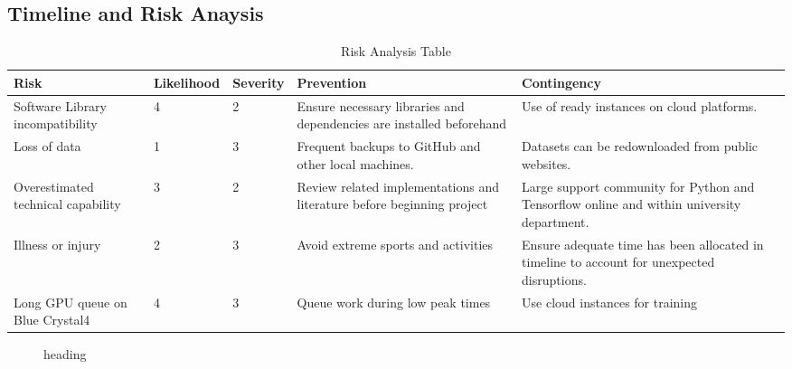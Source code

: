 \begin{landscape}
	\section{Timeline and Risk Anaysis }
	\begin{table}[H]
		
		\begin{tabular}{| p{5cm} | l | l | p{5cm} | p{5cm}| }
			\hline
			Risk & Likelihood & Severity & Prevention & Contingency \\ \hline 
			
			Software Library incompatibility & 4 & 2 & Ensure necessary libraries and dependencies are installed beforehand  &  Use of ready instances on cloud platforms.\\  \hline 
			
			Loss of data & 1 & 3 & Frequent backups to GitHub and other local machines. & Datasets can be redownloaded from public websites.  \\ \hline
			
			Overestimated technical capability & 3 & 2 & Review related implementations and literature before beginning project & Large support community for Python and Tensorflow online and within university department. \\ \hline 
			
			Illness or injury & 2 & 3 & Avoid extreme sports and activities & Ensure adequate time has been allocated in timeline to account for unexpected disruptions. \\ \hline 
			
			Long GPU queue on Blue Crystal4 & 4 &3 & Queue work during low peak times & Use cloud instances for training \\ 
			\hline 
			
		\end{tabular}
		\caption{Risk Analysis Table}
		\label{table:risk analysis}
	\end{table}
	
\end{landscape}


\newpage

\begin{landscape}
	\begin{figure}
		
		\caption*{heading}
	\end{figure}
\end{landscape}




